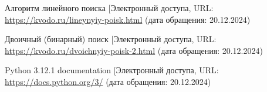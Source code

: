\renewcommand\bibname{\centerline{СПИСОК ИСПОЛЬЗОВАННЫХ ИСТОЧНИКОВ}}

\begin{thebibliography}{3}
	\makeatletter
	\def\@biblabel#1{#1. }
	
	Алгоритм линейного поиска [Электронный \text{ресурс]. -- Режим} доступа, URL: \url{https://kvodo.ru/lineynyiy-poisk.html} (дата обращения: 20.12.2024)
	
	Двоичный (бинарный) поиск [Электронный \text{ресурс]. -- Режим} доступа, URL: \url{https://kvodo.ru/dvoichnyiy-poisk-2.html} (дата обращения: 20.12.2024)
	
	Python 3.12.1 documentation [Электронный \text{ресурс]. -- Режим} доступа, URL: \url{https://docs.python.org/3/} (дата обращения: 20.12.2024)
\end{thebibliography}